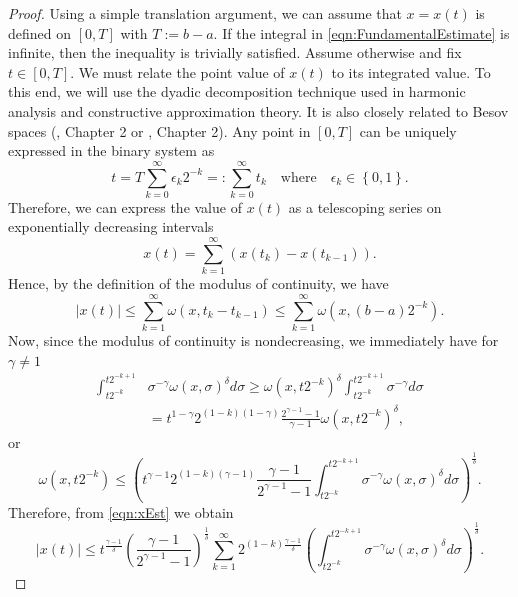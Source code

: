 \documentclass[12pt,a4paper]{article}
\begin{document}
\begin{proof}
	Using a simple translation argument, we can assume that $x=x(t)$ is defined on $[0,T]$ with $T:=b-a$. If the integral in \eqref{eqn:FundamentalEstimate} is infinite, then the inequality is trivially satisfied. Assume otherwise and fix $t\in [0, T]$. We must relate the point value of $x(t)$ to its integrated value. To this end, we will use the dyadic decomposition technique used in harmonic analysis and constructive approximation theory. It is also closely related to Besov spaces (\cite{bahouri2011fourier}, Chapter 2 or \cite{devore1993constructive}, Chapter 2). Any point in $[0,T]$ can be uniquely expressed in the binary system as
	\begin{equation}
		t = T\sum_{k=0}^\infty \epsilon_k 2^{-k} =: \sum_{k=0}^\infty t_k \quad \text{where} \quad \epsilon_k \in \left\{0,1\right\}.
	\end{equation}
	Therefore, we can express the value of $x(t)$ as a telescoping series on exponentially decreasing intervals
	\begin{equation}
		x(t) = \sum_{k=1}^\infty (x(t_k) - x({t_{k-1}})).
	\end{equation}
	Hence, by the definition of the modulus of continuity, we have
	\begin{equation}\label{eqn:xEst}
		|x(t)| \leq \sum_{k=1}^\infty \omega(x, t_k - t_{k-1}) \leq \sum_{k=1}^\infty \omega(x, (b-a)2^{-k}).
	\end{equation}
	Now, since the modulus of continuity is nondecreasing, we immediately have for $\gamma \neq 1$
	\begin{equation}
		\begin{split}
			\int_{t2^{-k}}^{t2^{-k+1}} &\sigma^{-\gamma} \omega(x, \sigma)^\delta d\sigma \geq \omega(x, t2^{-k})^\delta \int_{t2^{-k}}^{t2^{-k+1}} \sigma^{-\gamma} d\sigma \\
			&= t^{1-\gamma}2^{(1-k)(1-\gamma)}\frac{2^{\gamma-1}-1}{\gamma-1} \omega(x, t2^{-k})^\delta,
		\end{split}
	\end{equation}
	or
	\begin{equation}
		\omega(x, t2^{-k}) \leq \left(t^{\gamma-1} 2^{(1-k)(\gamma-1)} \frac{\gamma-1}{2^{\gamma-1}-1} \int_{t2^{-k}}^{t2^{-k+1}} \sigma^{-\gamma} \omega(x, \sigma)^\delta d\sigma\right)^\frac{1}{\delta}.
	\end{equation}
	Therefore, from \eqref{eqn:xEst} we obtain
	\begin{equation}
		|x(t)| \leq t^\frac{\gamma-1}{\delta} \left(\frac{\gamma-1}{2^{\gamma-1}-1}\right)^\frac{1}{\delta} \sum_{k=1}^\infty 2^{(1-k)\frac{\gamma-1}{\delta}}\left(\int_{t2^{-k}}^{t2^{-k+1}} \sigma^{-\gamma} \omega(x, \sigma)^\delta d\sigma\right)^\frac{1}{\delta}.

\end{equation}
\end{proof}
\end{document}
